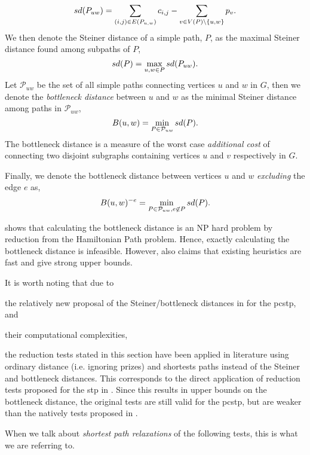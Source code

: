  $$sd(P_{uw}) = \sum_{(i,j) \in E(P_{u,w})} c_{i,j} -
 \sum_{v \in V(P) \setminus \{u,w\}} p_{v}\mathnormal{.}$$
 We then denote the Steiner distance of a simple path, $P$, as the maximal Steiner
 distance found among subpaths of $P$,
 $$sd(P) = \max_{u,w \in P} sd(P_{uw})\mathnormal{.}$$
 Let $\mathcal{P}_{uw}$ be the set of all simple paths
 connecting vertices $u$ and $w$ in
 $G$, then we denote the \textit{bottleneck distance} between $u$ and $w$ as the minimal Steiner
  distance among paths in $\mathcal{P}_{uw}$,
  $$B(u,w) = \min_{P \in  \mathcal{P}_{uw}} sd(P)\mathnormal{.}$$
  The bottleneck distance is a measure of the worst case \textit{additional cost}
 of connecting
 two disjoint subgraphs containing vertices $u$ and $v$ respectively in $G$.


  Finally, we denote the bottleneck distance between vertices $u$ and $w$ \textit{excluding}
  the edge $e$ as,
  $$B(u,w)^{-e} = \min_{P \in  \mathcal{P}_{uw}, e \not \in P} sd(P)\mathnormal{.}$$


 \cite{uchoa2006reduction} shows that calculating the bottleneck distance
 is an NP hard problem by reduction from the Hamiltonian Path problem. Hence,
 exactly calculating the bottleneck distance is infeasible. However, \cite{uchoa2006reduction}
 also claims that existing heuristics are fast and give strong upper bounds.

It is worth noting that due to
\begin{enumerate*}[label={\alph*)}]
\item the relatively new proposal of the Steiner/bottleneck distances in \cite{uchoa2006reduction} for the \gls{pcstp}, and
\item their computational complexities,
\end{enumerate*}
the reduction tests stated in this section have been applied in literature
using ordinary distance (i.e. ignoring prizes) and shortests paths
instead of the Steiner and bottleneck distances. This corresponds to the direct application of
reduction tests
proposed for the \gls{stp} in \cite{duin1989edge,duin1989reduction}. Since this results in
upper bounds on the bottleneck distance, the original
tests are still valid for the \gls{pcstp},
but are weaker than the natively tests proposed in \cite{uchoa2006reduction}.

When we talk
 about \textit{shortest path relaxations} of the following tests, this is what we are referring to.

